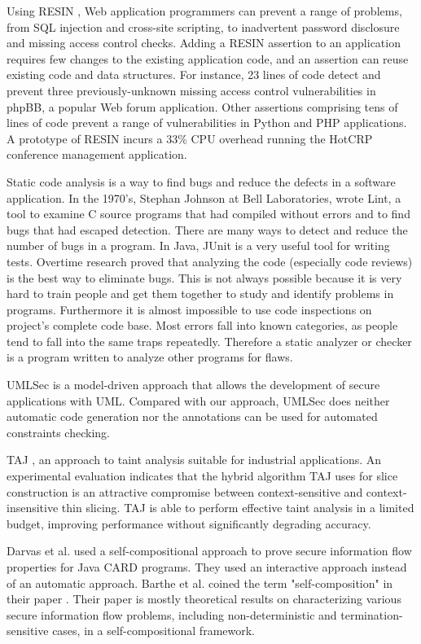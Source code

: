 Using RESIN \cite{ref_57_alex:improving}, Web application programmers can prevent a range
of problems, from SQL injection and cross-site scripting, to inadvertent password disclosure and missing access control checks. Adding
a RESIN assertion to an application requires few changes to the
existing application code, and an assertion can reuse existing code
and data structures. For instance, 23 lines of code detect and prevent
three previously-unknown missing access control vulnerabilities in
phpBB, a popular Web forum application. Other assertions comprising tens of lines of code prevent a range of vulnerabilities in Python
and PHP applications. A prototype of RESIN incurs a 33\% CPU
overhead running the HotCRP conference management application.

Static code analysis is a way to find bugs and reduce the defects in a software application. In the 1970's, Stephan Johnson at Bell Laboratories, wrote Lint, a tool to examine C
source programs that had compiled without errors and to find bugs that had escaped detection. There are many ways to detect and reduce the number of bugs in a program. In Java, JUnit is a very useful tool for writing tests. Overtime research proved that analyzing the code (especially code reviews) is the best way to eliminate bugs. This is not
always possible because it is very hard to train people and get them together to study and identify problems in programs. Furthermore it is almost impossible to use code inspections on project's complete code base.
Most errors fall into known categories, as people tend to fall into the same traps repeatedly. Therefore a static analyzer or checker is a program written to analyze other programs for flaws. 

UMLSec \cite{ref_33_juerjens:secure} is a model-driven approach that allows the
development of secure applications with UML. Compared with
our approach, UMLSec does neither automatic code
generation nor the annotations can be used for automated
constraints checking.

TAJ \cite{ref_100_tripp2009taj}, an approach to taint analysis suitable for industrial applications. An experimental evaluation indicates that
the hybrid algorithm TAJ uses for slice construction is an attractive
compromise between context-sensitive and context-insensitive
thin slicing. TAJ is able to perform effective taint analysis in a limited budget, improving performance without significantly degrading accuracy.

Darvas et al. \cite{ref_70_darvas2005theorem} used a self-compositional approach to prove secure information flow properties for Java CARD programs. They used an interactive approach instead of an automatic approach. Barthe et al. coined the term "self-composition" in their paper \cite{ref_71_barthe2004secure}. Their paper is mostly theoretical results on characterizing various secure information flow problems, including
non-deterministic and termination-sensitive cases, in a self-compositional framework.

